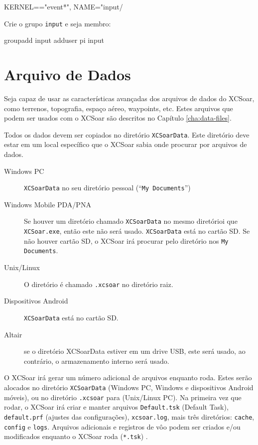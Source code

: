 \begin{verbatim*}
KERNEL=="event*", NAME="input/%k", MODE="660", GROUP="input"
\end{verbatim*}

Crie o grupo \texttt{input} e seja membro:

\begin{verbatim*}
groupadd input
adduser pi input
\end{verbatim*}

\section{Arquivo de Dados}\label{sec:data files}

Seja capaz de usar as características avançadas dos arquivos de dados do XCSoar, como terrenos, topografia, espaço aéreo, waypoints, etc.  
Estes arquivos que podem ser usados com o XCSoar são descritos no Capítulo
\ref{cha:data-files}.

Todos os dados devem ser copiados no diretório 
\texttt{XCSoarData}.  Este diretório deve estar em um local específico que o XCSoar sabia onde procurar por arquivos de dados.

\begin{description}
\item[Windows PC]
\texttt{XCSoarData} no seu diretório pessoal (``\texttt{My
Documents}'')
\item[Windows Mobile PDA/PNA]
Se houver um diretório chamado \texttt{XCSoarData} no mesmo diretórioi que \texttt{XCSoar.exe}, então este não será usado.
\texttt{XCSoarData} está no cartão SD.  Se não houver cartão SD, o XCSoar irá procurar pelo diretório nos \texttt{My Documents}.
\item[Unix/Linux]
O diretório é chamado \verb|.xcsoar| no diretório raiz.
\item[Dispositivos Android]
\texttt{XCSoarData} está no cartão SD.
\item[Altair]
se o diretório XCSoarData estiver em um drive USB, este será usado, ao contrário, o armazenamento interno será usado.
\end{description}


O XCSoar irá gerar um número adicional de arquivos enquanto roda.  Estes serão alocados no diretório  \texttt{XCSoarData} (Windows PC, 
Windows e dispositivos Android móveis), ou no diretório \texttt{.xcsoar} para (Unix/Linux
PC).  Na primeira vez que rodar, o XCSoar irá criar e manter arquivos
\texttt{Default.tsk} (Default Task),  
\texttt{default.prf} 
(ajustes das configurações),
\texttt{xcsoar.log}, 
mais três diretórios: \texttt{cache},
\texttt{config} e \texttt{logs}.  Arquivos adicionais e registros de vôo podem ser criados e/ou modificados enquanto o XCSoar roda (\texttt{*.tsk}) .


